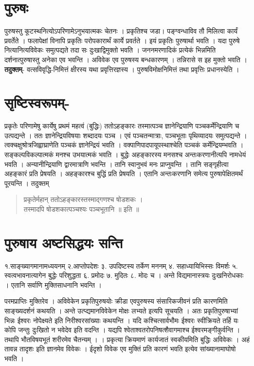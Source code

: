 \section*{पुरुषः}

पुरुषस्तु कूटस्थनित्योऽपरिणामेऽनुभयात्मकः चेतनः । प्रकृतिश्च जडा। पङ्ग्वन्धाविव तौ मिलित्वा कार्यं प्रवर्तेते । फलापेक्षां विनापि प्रकृतिः परोपकारार्थं कार्ये प्रवर्तते । इयं प्रकृतिः पुरुषार्था भवति । यदा पुरुषे नित्यानित्यविवेकः समुत्पद्यते तदा सः दुःखाद्विमुक्तो भवति । जननमरणादिकं प्रत्येकं भिन्नमिति दर्शनात्पुरुषास्तु अनेका एव भवन्ति । अविवेक एव पुरुषस्य बन्धकारणम् । तन्निरासे स इह मुक्तो भवति । \textbf{तदुक्तम्}- वत्सविवृद्धि-निमित्तं क्षीरस्य यथा प्रवृत्तिरज्ञस्य । पुरुषविमोक्षनिमित्तं तथा प्रवृत्तिः प्रधानस्येति ।

\section*{सृष्टिस्वरूपम्-} 

प्रकृतेः परिणामेषु कार्येषु प्रथमं महत्वं (बुद्धिः)  ततोऽहङ्कारः  तस्मात्पञ्च ज्ञानेन्द्रियाणि पञ्चकर्मेन्द्रियाणि च उत्पद्यन्ते । ततः ज्ञानेन्द्रियविषयाः शब्दादयः पञ्च । एवं पञ्चतन्मात्राः, पञ्चभूताः पृथिव्यादयः समुत्पद्यन्ते । त्वक्चक्षुश्रोत्रजिह्वाघ्राणेति पञ्चकं ज्ञानेन्द्रियं भवति । वक्पाणिपादपायूपस्थाश्चेति पञ्चकं कर्मेन्द्रियम्भवति । सङ्कल्पविकल्पात्मकं मनश्च उभयात्मकं भवति । बुद्धेः अहङ्कारस्य मनसश्च अन्तःकरणानीत्यपि नामधेयं भवति । अन्यानीन्द्रियाणि द्वारमात्राणि भवन्ति । तानि स्वानुभवं मनः प्राप्नुवन्ति । तानि सङ्गृहीत्वा अहङ्कारं प्रति प्रेषयति । अहङ्कारश्च बुद्धिं प्रति प्रेषयति । एतानि अन्तःकरणानि समेत्य पुरुषापेक्षितमर्थं पूरयन्ति । तदुक्तम् 
\begin{verse}
प्रकृतेर्महान् ततोऽहङ्कारस्तस्माद्गणश्च षोडशकः ।\\
तस्मादपि षोडशकात्पञ्चश्यः पञ्चभूतानि ॥ इति ॥
\end{verse}

\section*{पुरुषाय अष्टसिद्धयः सन्ति}

१.साङ्ख्यागमानामध्ययनम् 	२.आप्तोपदेशः ३.  उपदिष्टस्य तर्केण मननम्
४. सहाध्यायिभिस्सः विमर्शः 	५. स्वत्वभावनात्यागेन बुद्धेः परिशुद्धता	६. प्रमोदः
७. मुदितः	८. मोदः च । अन्ते विद्यमानास्त्रयः दुःखनिरोधकाः । एतानि सर्वाणि मुक्तिसाधनानि भवन्ति ।

परमप्राप्तिः मुक्तिरेव । अविवेकेन प्रकृतिपुरुषयोः क्रीडा एवपुरुषस्य संसारिकजीवनं प्रति कारणमिति साङ्ख्यदर्शनं कथयति । अन्ते उत्प्द्यमानविवेकेन मोक्षः लभ्यते इत्यपि सूचयति । अतः प्रकृतिपुरुषाभ्यां भिन्नः ईश्वरः नोपेक्ष्यते इति निरीश्वरसांख्याः कथयन्ति । यदि कश्चित्सार्वभौमः ईश्वरः स्वीक्रियते तर्हि यः कोपि जन्तुः दुःखितो न भवेदेव इति वदन्ति । यद्यपि श्वेताश्वतरोपनिषत्शैवागमाश्च ईश्वरमङ्गीकुर्वन्ति । तथापि भौतविषयभूतं शरीरमेव चैतन्यम् । । प्रकृत्या क्रियमाणं कार्यजातं स्वकीयमिति बुद्धिः अविवेकः । अहं तावन्न तादृशः इति ज्ञानमेव विवेकः । ईदृशो विवेक एव मुक्तिं प्रति कारणं भवति इत्येव सांख्यानामाघोषो भवति ।

\articleend

